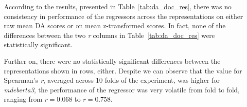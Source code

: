 According to the results, presented in Table~\ref{tab:da_doc_res}, there was no consistency in performance of the regressors across the representations on either raw mean DA scores or on mean z-transformed scores. In fact, none of the differences between the two \textit{r} columns in Table~\ref{tab:da_doc_res} were statistically significant.

Further on, there were no statistically significant differences between the representations shown in rows, either. Despite we can observe that the value for Spearman's \textit{r}, averaged across 10 folds of the experiment, was higher for \textit{mdeberta3}, the performance of the regressor was very volatile from fold to fold, ranging from $r=0.068$ to $r=0.758$. 



